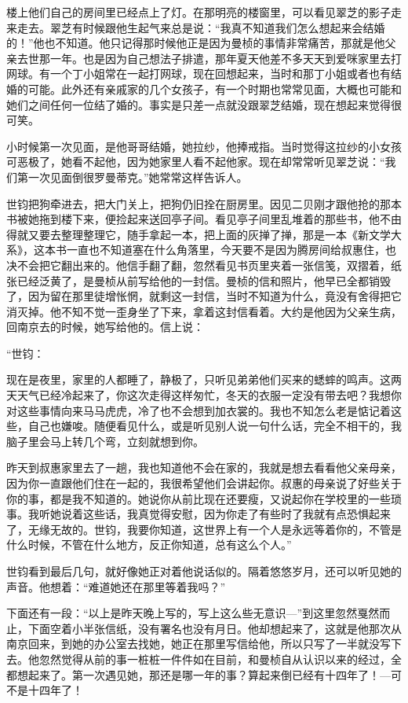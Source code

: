 \par 楼上他们自己的房间里已经点上了灯。在那明亮的楼窗里，可以看见翠芝的影子走来走去。翠芝有时候跟他生起气来总是说：“我真不知道我们怎么想起来会结婚的！”他也不知道。他只记得那时候他正是因为曼桢的事情非常痛苦，那就是他父亲去世那一年。也是因为自己想法子排遣，那年夏天他差不多天天到爱咪家里去打网球。有一个丁小姐常在一起打网球，现在回想起来，当时和那丁小姐或者也有结婚的可能。此外还有亲戚家的几个女孩子，有一个时期也常常见面，大概也可能和她们之间任何一位结了婚的。事实是只差一点就没跟翠芝结婚，现在想起来觉得很可笑。
\par 小时候第一次见面，是他哥哥结婚，她拉纱，他捧戒指。当时觉得这拉纱的小女孩可恶极了，她看不起他，因为她家里人看不起他家。现在却常常听见翠芝说：“我们第一次见面倒很罗曼蒂克。”她常常这样告诉人。
\par 世钧把狗牵进去，把大门关上，把狗仍旧拴在厨房里。因见二贝刚才跟他抢的那本书被她拖到楼下来，便捡起来送回亭子间。看见亭子间里乱堆着的那些书，他不由得就又要去整理整理它，随手拿起一本，把上面的灰掸了掸，那是一本《新文学大系》，这本书一直也不知道塞在什么角落里，今天要不是因为腾房间给叔惠住，也决不会把它翻出来的。他信手翻了翻，忽然看见书页里夹着一张信笺，双摺着，纸张已经泛黄了，是曼桢从前写给他的一封信。曼桢的信和照片，他早已全都销毁了，因为留在那里徒增怅惘，就剩这一封信，当时不知道为什么，竟没有舍得把它消灭掉。他不知不觉一歪身坐了下来，拿着这封信看着。大约是他因为父亲生病，回南京去的时候，她写给他的。信上说：
\par “世钧：
\par 现在是夜里，家里的人都睡了，静极了，只听见弟弟他们买来的蟋蟀的鸣声。这两天天气已经冷起来了，你这次走得这样匆忙，冬天的衣服一定没有带去吧？我想你对这些事情向来马马虎虎，冷了也不会想到加衣裳的。我也不知怎么老是惦记着这些，自己也嫌唆。随便看见什么，或是听见别人说一句什么话，完全不相干的，我脑子里会马上转几个弯，立刻就想到你。
\par 昨天到叔惠家里去了一趟，我也知道他不会在家的，我就是想去看看他父亲母亲，因为你一直跟他们住在一起的，我很希望他们会讲起你。叔惠的母亲说了好些关于你的事，都是我不知道的。她说你从前比现在还要瘦，又说起你在学校里的一些琐事。我听她说着这些话，我真觉得安慰，因为你走了有些时了我就有点恐惧起来了，无缘无故的。世钧，我要你知道，这世界上有一个人是永远等着你的，不管是什么时候，不管在什么地方，反正你知道，总有这么个人。”
\par 世钧看到最后几句，就好像她正对着他说话似的。隔着悠悠岁月，还可以听见她的声音。他想着：“难道她还在那里等着我吗？”
\par 下面还有一段：“以上是昨天晚上写的，写上这么些无意识—”到这里忽然戛然而止，下面空着小半张信纸，没有署名也没有月日。他却想起来了，这就是他那次从南京回来，到她的办公室去找她，她正在那里写信给他，所以只写了一半就没写下去。他忽然觉得从前的事一桩桩一件件如在目前，和曼桢自从认识以来的经过，全都想起来了。第一次遇见她，那还是哪一年的事？算起来倒已经有十四年了！—可不是十四年了！


